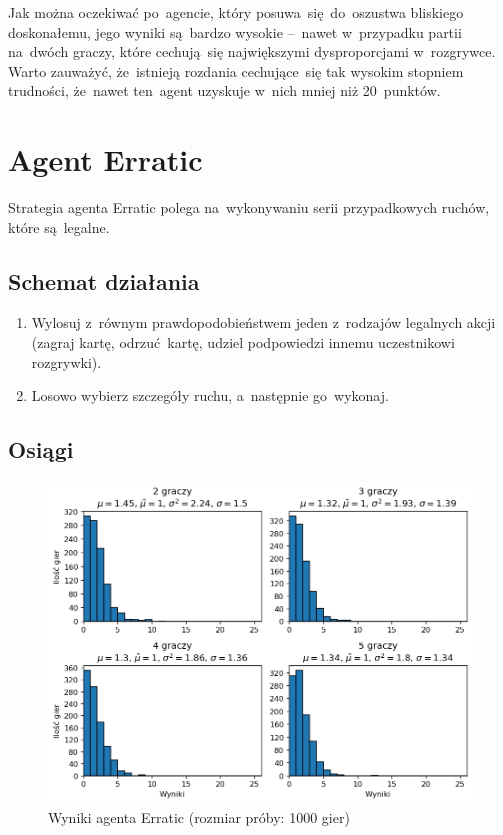 \documentclass[declaration,shortabstract,inz]{iithesis}
\begin{document}
Jak można oczekiwać po~agencie, który posuwa~się do~oszustwa bliskiego doskonałemu, jego wyniki są~bardzo wysokie --~nawet w~przypadku partii na~dwóch graczy, które cechują~się największymi dysproporcjami w~rozgrywce. Warto zauważyć, że~istnieją rozdania cechujące~się tak wysokim stopniem trudności, że~nawet ten~agent uzyskuje w~nich mniej niż 20~punktów.

\section{Agent Erratic}

Strategia agenta Erratic polega na~wykonywaniu serii przypadkowych ruchów, które są~legalne.

\subsection*{Schemat działania}

\begin{enumerate}
	\item Wylosuj z~równym prawdopodobieństwem jeden z~rodzajów legalnych akcji (zagraj kartę, odrzuć kartę, udziel podpowiedzi innemu uczestnikowi rozgrywki).
	\item Losowo wybierz szczegóły ruchu, a~następnie go~wykonaj.
\end{enumerate}


\subsection*{Osiągi}

\begin{figure}[H]
	\centering
	\captionsetup{format=hang}
	\includegraphics[width=\textwidth,height=\textheight,keepaspectratio]{Erratic.png}
	\caption[Caption]{Wyniki agenta Erratic (rozmiar próby: 1000 gier)}
	\label{fig:Erratic}
\end{figure}
\end{document}
